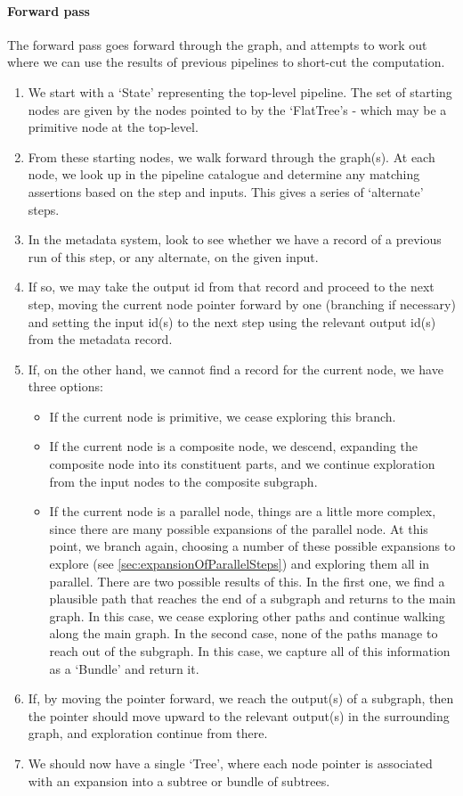 \documentclass[10pt,a4paper]{article}
\begin{document}
\begin{appendices}
\paragraph{Forward pass}
The forward pass goes forward through the graph, and attempts to work out where we can use the results of previous pipelines to short-cut the computation.
\begin{enumerate}
\item We start with a `State' representing the top-level pipeline. The set of starting nodes are given by the nodes pointed to by the `FlatTree's - which may be a primitive node at the top-level.
\item From these starting nodes, we walk forward through the graph(s). At each node, we look up in the pipeline catalogue and determine any matching assertions based on the step and inputs. This gives a series of `alternate' steps.
\item In the metadata system, look to see whether we have a record of a previous run of this step, or any alternate, on the given input.
\item If so, we may take the output id from that record and proceed to the next step, moving the current node pointer forward by one (branching if necessary) and setting the input id(s) to the next step using the relevant output id(s) from the metadata record.
\item If, on the other hand, we cannot find a record for the current node, we have three options:
\begin{itemize}
\item If the current node is primitive, we cease exploring this branch.
\item If the current node is a composite node, we descend, expanding the composite node into its constituent parts, and we continue exploration from the input nodes to the composite subgraph.
\item If the current node is a parallel node, things are a little more complex, since there are many possible expansions of the parallel node. At this point, we branch again, choosing a number of these possible expansions to explore (see \ref{sec:expansionOfParallelSteps}) and exploring them all in parallel. There are two possible results of this. In the first one, we find a plausible path that reaches the end of a subgraph and returns to the main graph. In this case, we cease exploring other paths and continue walking along the main graph. In the second case, none of the paths manage to reach out of the subgraph. In this case, we capture all of this information as a `Bundle' and return it.
\end{itemize}
\item If, by moving the pointer forward, we reach the output(s) of a subgraph, then the pointer should move upward to the relevant output(s) in the surrounding graph, and exploration continue from there.
\item We should now have a single `Tree', where each node pointer is associated with an expansion into a subtree or bundle of subtrees.
\end{enumerate}

\end{appendices}
\end{document}
